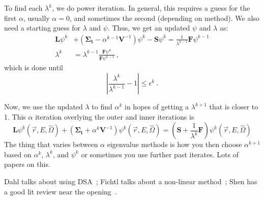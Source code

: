 \documentclass[12pt,twoside]{article}
\newcommand{\vOmega}{\ensuremath{\hat{\Omega}}}
\newcommand{\ve}[1]{\ensuremath{\mathbf{#1}}}
\begin{document}
To find each $\lambda^k$, we do power iteration. 
In general, this requires a guess for the first $\alpha$, usually $\alpha=0$, and sometimes the second (depending on method). 
We also need a starting guess for $\lambda$ and $\psi$. Thus, we get an updated $\psi$ and $\lambda$ as:
\begin{align*}
\ve{L} \psi^k &+ (\ve{\Sigma_t} - \alpha^{k-1} \ve{V}^{-1}) \psi^k -\ve{S}\psi^k = \frac{1}{\lambda^{k-1}} \ve{F} \psi^{k-1}\\
\lambda^k &= \lambda^{k-1}\frac{\ve{F} \psi^k}{\ve{F} \psi^{k-1}}\:,
\end{align*}
which is done until 
\[
|\frac{\lambda^k}{\lambda^{k-1}} - 1 | \leq \epsilon^k\:.
\]

Now, we use the updated $\lambda$ to find $\alpha^k$ in hopes of getting a $\lambda^{k+1}$ that is closer to 1. 
This $\alpha$ iteration overlying the outer and inner iterations is
\[
\ve{L} \psi^k(\vec{r}, E, \vOmega) + (\ve{\Sigma_t} + \alpha^k \ve{V}^{-1}) \psi^k(\vec{r}, E, \vOmega) = (\ve{S} + \frac{1}{\lambda^k}\ve{F}) \psi^k(\vec{r}, E, \vOmega)
\]
The thing that varies between $\alpha$ eigenvalue methods is how you then choose $\alpha^{k+1}$ based on $\alpha^k$, $\lambda^k$, and $\psi^k$ or sometimes you use further past iterates. 
Lots of  papers on this.

Dahl talks about using DSA~\cite{Dahl2006}; Fichtl talks about a non-linear method~\cite{Fichtl}; Shen has a good lit review near the opening~\cite{Shen2015}.




\end{document}

